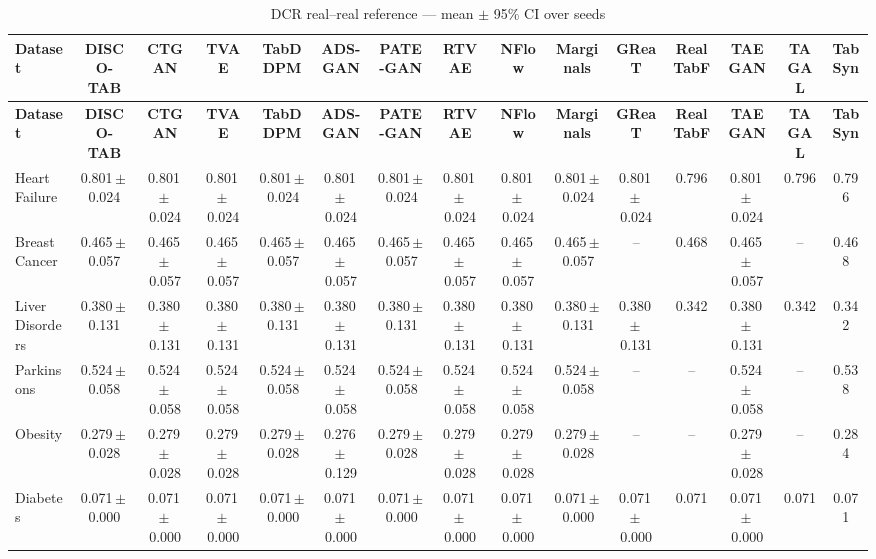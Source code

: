 \documentclass[8pt]{extarticle}
\begin{document}
\begin{longtable}{l*{14}{c}}
\caption{DCR real--real reference --- mean $\pm$ 95\% CI over seeds}\\
\toprule
\textbf{Dataset} & \textbf{DISCO-TAB} & \textbf{CTGAN} & \textbf{TVAE} & \textbf{TabDDPM} & \textbf{ADS-GAN} & \textbf{PATE-GAN} & \textbf{RTVAE} & \textbf{NFlow} & \textbf{Marginals} & \textbf{GReaT} & \textbf{RealTabF} & \textbf{TAEGAN} & \textbf{TAGAL} & \textbf{TabSyn} \\
\midrule
\endfirsthead
\toprule
\textbf{Dataset} & \textbf{DISCO-TAB} & \textbf{CTGAN} & \textbf{TVAE} & \textbf{TabDDPM} & \textbf{ADS-GAN} & \textbf{PATE-GAN} & \textbf{RTVAE} & \textbf{NFlow} & \textbf{Marginals} & \textbf{GReaT} & \textbf{RealTabF} & \textbf{TAEGAN} & \textbf{TAGAL} & \textbf{TabSyn} \\
\midrule
\endhead
\bottomrule
\endfoot
Heart Failure & 0.801\,$\pm$\,0.024 & 0.801\,$\pm$\,0.024 & 0.801\,$\pm$\,0.024 & 0.801\,$\pm$\,0.024 & 0.801\,$\pm$\,0.024 & 0.801\,$\pm$\,0.024 & 0.801\,$\pm$\,0.024 & 0.801\,$\pm$\,0.024 & 0.801\,$\pm$\,0.024 & 0.801\,$\pm$\,0.024 & 0.796 & 0.801\,$\pm$\,0.024 & 0.796 & 0.796 \\
Breast Cancer & 0.465\,$\pm$\,0.057 & 0.465\,$\pm$\,0.057 & 0.465\,$\pm$\,0.057 & 0.465\,$\pm$\,0.057 & 0.465\,$\pm$\,0.057 & 0.465\,$\pm$\,0.057 & 0.465\,$\pm$\,0.057 & 0.465\,$\pm$\,0.057 & 0.465\,$\pm$\,0.057 & -- & 0.468 & 0.465\,$\pm$\,0.057 & -- & 0.468 \\
Liver Disorders & 0.380\,$\pm$\,0.131 & 0.380\,$\pm$\,0.131 & 0.380\,$\pm$\,0.131 & 0.380\,$\pm$\,0.131 & 0.380\,$\pm$\,0.131 & 0.380\,$\pm$\,0.131 & 0.380\,$\pm$\,0.131 & 0.380\,$\pm$\,0.131 & 0.380\,$\pm$\,0.131 & 0.380\,$\pm$\,0.131 & 0.342 & 0.380\,$\pm$\,0.131 & 0.342 & 0.342 \\
Parkinsons & 0.524\,$\pm$\,0.058 & 0.524\,$\pm$\,0.058 & 0.524\,$\pm$\,0.058 & 0.524\,$\pm$\,0.058 & 0.524\,$\pm$\,0.058 & 0.524\,$\pm$\,0.058 & 0.524\,$\pm$\,0.058 & 0.524\,$\pm$\,0.058 & 0.524\,$\pm$\,0.058 & -- & -- & 0.524\,$\pm$\,0.058 & -- & 0.538 \\
Obesity & 0.279\,$\pm$\,0.028 & 0.279\,$\pm$\,0.028 & 0.279\,$\pm$\,0.028 & 0.279\,$\pm$\,0.028 & 0.276\,$\pm$\,0.129 & 0.279\,$\pm$\,0.028 & 0.279\,$\pm$\,0.028 & 0.279\,$\pm$\,0.028 & 0.279\,$\pm$\,0.028 & -- & -- & 0.279\,$\pm$\,0.028 & -- & 0.284 \\
Diabetes & 0.071\,$\pm$\,0.000 & 0.071\,$\pm$\,0.000 & 0.071\,$\pm$\,0.000 & 0.071\,$\pm$\,0.000 & 0.071\,$\pm$\,0.000 & 0.071\,$\pm$\,0.000 & 0.071\,$\pm$\,0.000 & 0.071\,$\pm$\,0.000 & 0.071\,$\pm$\,0.000 & 0.071\,$\pm$\,0.000 & 0.071 & 0.071\,$\pm$\,0.000 & 0.071 & 0.071 \\

\end{longtable}
\end{document}
